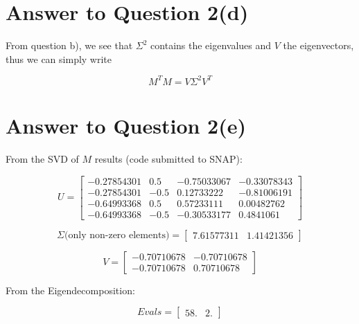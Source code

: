 \documentclass[11pt]{article}
\begin{document}
\pagebreak[4]
\section*{Answer to Question 2(d)}

From question b), we see that $\Sigma ^2$ contains the eigenvalues and $V$ the eigenvectors, thus we can simply write 

\begin{equation}
    M^TM = V \Sigma^2 V^T
\end{equation}

\pagebreak[4]
\section*{Answer to Question 2(e)}

From the SVD of $M$ results (code submitted to SNAP):

\begin{equation}
    U=
  \begin{bmatrix}
    -0.27854301 &  0.5        & -0.75033067 & -0.33078343\\
    -0.27854301 & -0.5        &  0.12733222 & -0.81006191\\
    -0.64993368 &  0.5        &  0.57233111 &  0.00482762\\
    -0.64993368 & -0.5        & -0.30533177 &  0.4841061 
  \end{bmatrix}
\end{equation}


\begin{equation}
    \Sigma \text{(only non-zero elements)} =
  \begin{bmatrix}
    7.61577311  & 1.41421356
  \end{bmatrix}
\end{equation}

\begin{equation}
    V =
  \begin{bmatrix}
    -0.70710678 & -0.70710678 \\
    -0.70710678 &  0.70710678
  \end{bmatrix}
\end{equation}

From the Eigendecomposition:

\begin{equation}
    Evals =
  \begin{bmatrix}
    58.  & 2.
  \end{bmatrix}
\end{equation}
\end{document}
